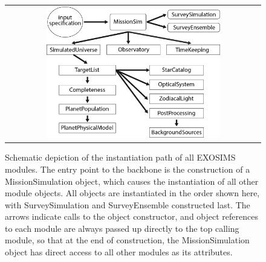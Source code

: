\documentclass[cleanfoot]{asme2ej}
\begin{document}
\begin{figure}[ht]
    \begin{center}
        \begin{tabular}{c}
             \includegraphics[width=0.7\textwidth]{instantiation_tree1}
        \end{tabular}
    \end{center}
    \caption{Schematic depiction of the instantiation path of all EXOSIMS modules.  The entry point to the backbone is the construction of a MissionSimulation object, which causes the instantiation of all other module objects.  All objects are instantiated in the order shown here, with SurveySimulation and SurveyEnsemble constructed last.  The arrows indicate calls to the object constructor, and object references to each module are always passed up directly to the top calling module, so that at the end of construction, the MissionSimulation object has direct access to all other modules as its attributes.}
    \label{fig:instantiation_tree}
\end{figure}
\end{document}
